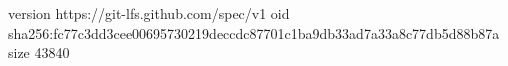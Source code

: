 version https://git-lfs.github.com/spec/v1
oid sha256:fc77c3dd3cee00695730219deccdc87701c1ba9db33ad7a33a8c77db5d88b87a
size 43840
